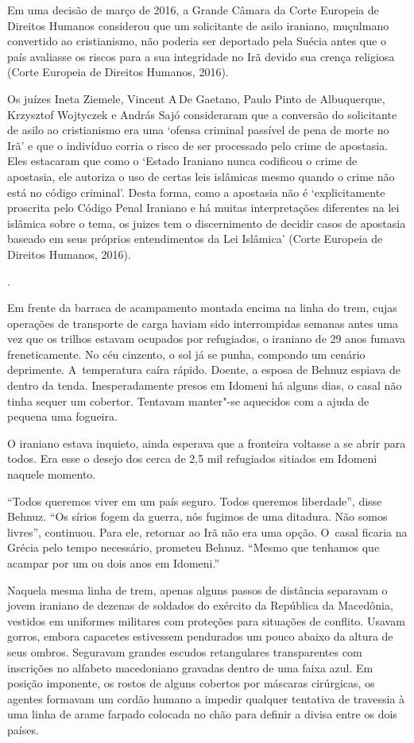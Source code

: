 {Em uma decisão de março de 2016, a Grande Câmara da Corte Europeia de
Direitos Humanos considerou que um solicitante de asilo iraniano,
muçulmano convertido ao cristianismo, não poderia ser deportado pela
Suécia antes que o país avaliasse os riscos para a sua integridade no
Irã devido sua crença religiosa (Corte Europeia de Direitos Humanos,
2016).

Os juízes Ineta Ziemele, Vincent A\,De Gaetano, Paulo Pinto de
Albuquerque, Krzysztof Wojtyczek e András Sajó consideraram que a
conversão do solicitante de asilo ao cristianismo era uma `ofensa
criminal passível de pena de morte no Irã' e que o indivíduo corria o
risco de ser processado pelo crime de apostasia. Eles estacaram que como
o `Estado Iraniano nunca codificou o crime de apostasia, ele autoriza o
uso de certas leis islâmicas mesmo quando o crime não está no código
criminal'. Desta forma, como a apostasia não é `explicitamente proscrita
pelo Código Penal Iraniano e há muitas interpretações diferentes na lei
islâmica sobre o tema, os juizes tem o discernimento de decidir casos de
apostasia baseado em seus próprios entendimentos da Lei Islâmica' (Corte
Europeia de Direitos Humanos, 2016).
}.

Em frente da barraca de acampamento montada encima na linha do trem,
cujas operações de transporte de carga haviam sido interrompidas semanas
antes uma vez que os trilhos estavam ocupados por refugiados, o iraniano
de 29 anos fumava freneticamente. No céu cinzento, o sol já se punha,
compondo um cenário deprimente. A~temperatura caíra rápido. Doente, a
esposa de Behnuz espiava de dentro da tenda. Inesperadamente presos em
Idomeni há alguns dias, o casal não tinha sequer um cobertor. Tentavam
manter"-se aquecidos com a ajuda de pequena uma fogueira.

O iraniano estava inquieto, ainda esperava que a fronteira voltasse a se
abrir para todos. Era esse o desejo dos cerca de 2,5 mil refugiados
sitiados em Idomeni naquele momento.

``Todos queremos viver em um país seguro. Todos queremos liberdade'',
disse Behnuz. ``Os sírios fogem da guerra, nós fugimos de uma ditadura.
Não somos livres'', continuou. Para ele, retornar ao Irã não era uma
opção. O~casal ficaria na Grécia pelo tempo necessário, prometeu Behnuz.
``Mesmo que tenhamos que acampar por um ou dois anos em Idomeni.''

Naquela mesma linha de trem, apenas alguns passos de distância separavam
o jovem iraniano de dezenas de soldados do exército da República da
Macedônia, vestidos em uniformes militares com proteções para situações
de conflito. Usavam gorros, embora capacetes estivessem pendurados um
pouco abaixo da altura de seus ombros. Seguravam grandes escudos
retangulares transparentes com inscrições no alfabeto macedoniano
gravadas dentro de uma faixa azul. Em posição imponente, os rostos de
alguns cobertos por máscaras cirúrgicas, os agentes formavam um cordão
humano a impedir qualquer tentativa de travessia à uma linha de arame
farpado colocada no chão para definir a divisa entre os dois países.

